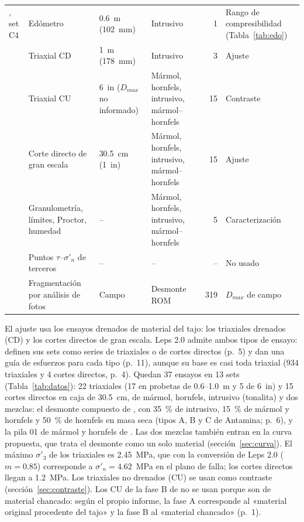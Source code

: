 \documentclass[11pt,letterpaper]{article}
\begin{document}
\begin{footnotesize}
\begin{longtable}{L{3.0cm}L{3.0cm}L{2.2cm}L{2.6cm}rL{3.0cm}}
\citet{w2024}, set C4 & Edómetro & 0.6~m (102~mm) & Intrusivo & 1 & Rango de compresibilidad (Tabla~\ref{tab:edo}) \\
\citet{i2025} & Triaxial CD & 1~m (178~mm) & Intrusivo & 3 & Ajuste \\
\citet{anddes2024} & Triaxial CU & 6~in ($D_{max}$ no informado) & Mármol, hornfels, intrusivo, mármol--hornfels & 15 & Contraste \\
\citet{anddes2024} & Corte directo de gran escala & 30.5~cm (1~in) & Mármol, hornfels, intrusivo, mármol--hornfels & 15 & Ajuste \\
\citet{anddes2024} & Granulometría, límites, Proctor, humedad & -- & Mármol, hornfels, intrusivo, mármol--hornfels & 5 & Caracterización \\
\citet{stantec2023} & Puntos $\tau$--$\sigma'_n$ de terceros & -- & -- & -- & No usado \\
\citet{antamina2025frag} & Fragmentación por análisis de fotos & Campo & Desmonte ROM & 319 & $D_{max}$ de campo \\
\bottomrule
\end{longtable}\end{footnotesize}

El ajuste usa los ensayos drenados de material del tajo: los triaxiales drenados (CD) y los cortes directos de gran escala. Leps 2.0 admite ambos tipos de ensayo: \citet{cylwik} definen sus sets como series de triaxiales o de cortes directos (p.~5) y dan una guía de esfuerzos para cada tipo (p.~11), aunque su base es casi toda triaxial (934 triaxiales y 4 cortes directos, p.~4). Quedan 37 ensayos en 13 sets (Tabla~\ref{tab:datos}): 22 triaxiales (17 en probetas de 0.6--1.0~m y 5 de 6~in) y 15 cortes directos en caja de 30.5~cm, de mármol, hornfels, intrusivo (tonalita) y dos mezclas: el desmonte compuesto de \citet{g2021}, con 35~\% de intrusivo, 15~\% de mármol y hornfels y 50~\% de hornfels en masa seca (tipos A, B y C de Antamina; p.~6), y la pila 01 de mármol y hornfels de \citet{anddes2024}. Las dos mezclas también entran en la curva propuesta, que trata el desmonte como un solo material (sección~\ref{sec:curva}). El máximo $\sigma'_3$ de los triaxiales es 2.45~MPa, que con la conversión de Leps 2.0 ($m = 0.85$) corresponde a $\sigma'_n = 4.62$~MPa en el plano de falla; los cortes directos llegan a 1.2~MPa. Los triaxiales no drenados (CU) se usan como contraste (sección~\ref{sec:contraste}). Los CU de la fase B de \citet{g2010} no se usan porque son de material chancado: según el propio informe, la fase A corresponde al «material original procedente del tajo» y la fase B al «material chancado» (p.~1).
\end{document}
